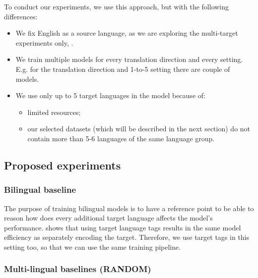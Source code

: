 To conduct our experiments, we use this approach, but with the following differences:
\begin{itemize}
	\item We fix English as a source language, as we are exploring the multi-target experiments only, .
	\item We train multiple models for every translation direction and every setting.
	E.g. for the  translation direction and 1-to-5 setting there are
	couple of  models.
	\item We use only up to 5 target languages in the model because of:
	\begin{itemize}
		\item limited resources;
		\item our selected datasets (which will be described in the next section)
		do not contain more than 5-6 languages of the same language group.
	\end{itemize}
\end{itemize}



\subsection{Proposed experiments}
\label{subsection:proposed_experiments}


\subsubsection*{Bilingual \gls{baseline}}

The purpose of training bilingual models is to have a reference point to be able to reason how
does every additional target language affects the model's performance.
 shows that using target language tags results
in the same model efficiency as separately encoding the target.
Therefore, we use target tags in this setting too, so that we can use
the same training pipeline.

\subsubsection*{Multi-lingual baselines (RANDOM)}

